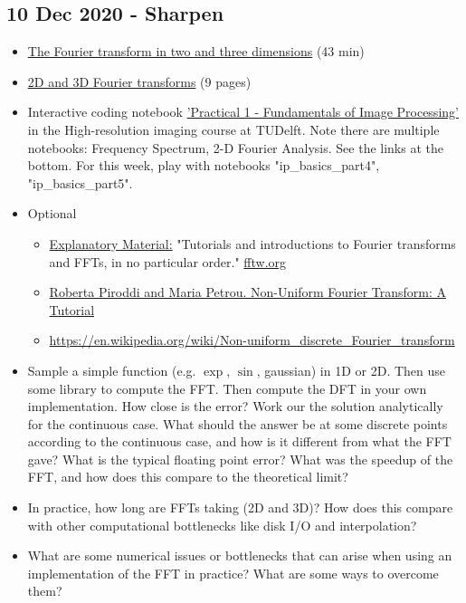 \documentclass[11pt, oneside]{article}   	%
\begin{document}
\subsection{10 Dec 2020 - Sharpen}
\begin{itemize}
\item \href{https://youtu.be/J1ViNmmQnd0}{The Fourier transform in two and three dimensions} (43 min)
	\item \href{https://cryoemprinciples.yale.edu/sites/default/files/files/4%20Fourier2D-3D.pdf}{2D and 3D Fourier transforms} (9 pages)
	\item Interactive coding notebook \href{https://gitlab.tudelft.nl/aj-lab/teaching/-/wikis/NB4020}{'Practical 1 - Fundamentals of Image Processing'} in the High-resolution imaging course at TUDelft. Note there are multiple notebooks: Frequency Spectrum, 2-D Fourier Analysis. See the links at the bottom. For this week, play with notebooks "ip\_basics\_part4", "ip\_basics\_part5".
	\item Optional
	\begin{itemize}
		\item \href{http://www.fftw.org/links.html}{Explanatory Material:} "Tutorials and introductions to Fourier transforms and FFTs, in no particular order." \url{fftw.org}
		\item \href{http://homepages.inf.ed.ac.uk/rbf/CVonline/LOCAL_COPIES/PIRODDI1/NUFT/NUFT.html}{Roberta Piroddi and Maria Petrou. Non-Uniform Fourier Transform: A Tutorial}
		\item \url{https://en.wikipedia.org/wiki/Non-uniform_discrete_Fourier_transform}
	\end{itemize}
\end{itemize}

\begin{itemize}
	\item Sample a simple function (e.g. $\exp$, $\sin$, gaussian) in 1D or 2D. Then use some library to compute the FFT. Then compute the DFT in your own implementation. How close is the error? Work our the solution analytically for the continuous case. What should the answer be at some discrete points according to the continuous case, and how is it different from what the FFT gave? What is the typical floating point error? What was the speedup of the FFT, and how does this compare to the theoretical limit?
	\item In practice, how long are FFTs taking (2D and 3D)? How does this compare with other computational bottlenecks like disk I/O and interpolation?
	\item What are some numerical issues or bottlenecks that can arise when using an implementation of the FFT in practice? What are some ways to overcome them?
\end{itemize}
\end{document}
